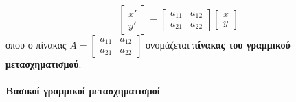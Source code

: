 \documentclass[twoside,11pt,a4paper]{book}
\begin{document}
\[ \begin{bmatrix}
x'\\y'
\end{bmatrix}=\begin{bmatrix}
a_{11} & a_{12}\\a_{21} & a_{22}
\end{bmatrix}\begin{bmatrix}
x\\y
\end{bmatrix} \]
όπου ο πίνακας $ A=\begin{bmatrix}
a_{11} & a_{12}\\a_{21} & a_{22}
\end{bmatrix} $ ονομάζεται \textbf{πίνακας του γραμμικού μετασχηματισμού}.\\\\
\textbf{Βασικοί γραμμικοί μετασχηματισμοί}
\end{document}
